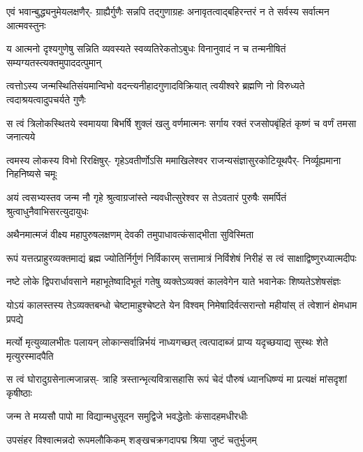 \fourlineindentedshloka
{एवं भवान्बुद्ध्यनुमेयलक्षणैर्-}
{ग्राह्यैर्गुणैः सन्नपि तद्गुणाग्रहः}
{अनावृतत्वाद्बहिरन्तरं न ते}
{सर्वस्य सर्वात्मन आत्मवस्तुनः} %

\fourlineindentedshloka
{य आत्मनो दृश्यगुणेषु सन्निति}
{व्यवस्यते स्वव्यतिरेकतोऽबुधः}
{विनानुवादं न च तन्मनीषितं}
{सम्यग्यतस्त्यक्तमुपाददत्पुमान्} %

\fourlineindentedshloka
{त्वत्तोऽस्य जन्मस्थितिसंयमान्विभो}
{वदन्त्यनीहादगुणादविक्रियात्}
{त्वयीश्वरे ब्रह्मणि नो विरुध्यते}
{त्वदाश्रयत्वादुपचर्यते गुणैः} %

\fourlineindentedshloka
{स त्वं त्रिलोकस्थितये स्वमायया}
{बिभर्षि शुक्लं खलु वर्णमात्मनः}
{सर्गाय रक्तं रजसोपबृंहितं}
{कृष्णं च वर्णं तमसा जनात्यये} %

\fourlineindentedshloka
{त्वमस्य लोकस्य विभो रिरक्षिषुर्-}
{गृहेऽवतीर्णोऽसि ममाखिलेश्वर}
{राजन्यसंज्ञासुरकोटियूथपैर्-}
{निर्व्यूह्यमाना निहनिष्यसे चमूः} %

\fourlineindentedshloka
{अयं त्वसभ्यस्तव जन्म नौ गृहे}
{श्रुत्वाग्रजांस्ते न्यवधीत्सुरेश्वर}
{स तेऽवतारं पुरुषैः समर्पितं}
{श्रुत्वाधुनैवाभिसरत्युदायुधः} %



\twolineshloka
{अथैनमात्मजं वीक्ष्य महापुरुषलक्षणम्}
{देवकी तमुपाधावत्कंसाद्भीता सुविस्मिता} %



\fourlineindentedshloka
{रूपं यत्तत्प्राहुरव्यक्तमाद्यं}
{ब्रह्म ज्योतिर्निर्गुणं निर्विकारम्}
{सत्तामात्रं निर्विशेषं निरीहं}
{स त्वं साक्षाद्विष्णुरध्यात्मदीपः} %

\fourlineindentedshloka
{नष्टे लोके द्विपरार्धावसाने}
{महाभूतेष्वादिभूतं गतेषु}
{व्यक्तेऽव्यक्तं कालवेगेन याते}
{भवानेकः शिष्यतेऽशेषसंज्ञः} %

\fourlineindentedshloka
{योऽयं कालस्तस्य तेऽव्यक्तबन्धो}
{चेष्टामाहुश्चेष्टते येन विश्वम्}
{निमेषादिर्वत्सरान्तो महीयांस्}
{तं त्वेशानं क्षेमधाम प्रपद्ये} %

\fourlineindentedshloka
{मर्त्यो मृत्युव्यालभीतः पलायन्}
{लोकान्सर्वान्निर्भयं नाध्यगच्छत्}
{त्वत्पादाब्जं प्राप्य यदृच्छयाद्य}
{सुस्थः शेते मृत्युरस्मादपैति} %

\fourlineindentedshloka
{स त्वं घोरादुग्रसेनात्मजान्नस्-}
{त्राहि त्रस्तान्भृत्यवित्रासहासि}
{रूपं चेदं पौरुषं ध्यानधिष्ण्यं}
{मा प्रत्यक्षं मांसदृशां कृषीष्ठाः} %

\twolineshloka
{जन्म ते मय्यसौ पापो मा विद्यान्मधुसूदन}
{समुद्विजे भवद्धेतोः कंसादहमधीरधीः} %

\twolineshloka
{उपसंहर विश्वात्मन्नदो रूपमलौकिकम्}
{शङ्खचक्रगदापद्म श्रिया जुष्टं चतुर्भुजम्} %

